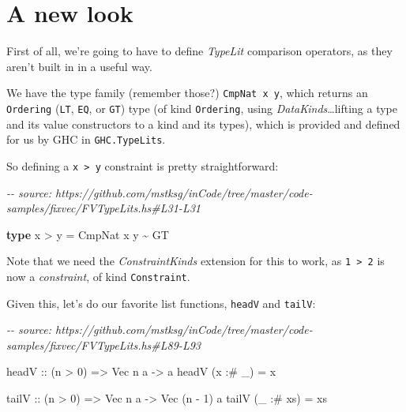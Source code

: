 \documentclass[]{article}
\newenvironment{Shaded}{}{}
\newcommand{\CommentTok}[1]{\textcolor[rgb]{0.38,0.63,0.69}{\textit{#1}}}
\newcommand{\DataTypeTok}[1]{\textcolor[rgb]{0.56,0.13,0.00}{#1}}
\newcommand{\DecValTok}[1]{\textcolor[rgb]{0.25,0.63,0.44}{#1}}
\newcommand{\KeywordTok}[1]{\textcolor[rgb]{0.00,0.44,0.13}{\textbf{#1}}}
\newcommand{\NormalTok}[1]{#1}
\newcommand{\OperatorTok}[1]{\textcolor[rgb]{0.40,0.40,0.40}{#1}}
\newcommand{\OtherTok}[1]{\textcolor[rgb]{0.00,0.44,0.13}{#1}}
\begin{document}
\section{A new look}\label{a-new-look}

First of all, we're going to have to define \emph{TypeLit} comparison operators,
as they aren't built in in a useful way.

We have the type family (remember those?) \texttt{CmpNat\ x\ y}, which returns
an \texttt{Ordering} (\texttt{LT}, \texttt{EQ}, or \texttt{GT}) type (of kind
\texttt{Ordering}, using \emph{DataKinds}\ldots lifting a type and its value
constructors to a kind and its types), which is provided and defined for us by
GHC in \texttt{GHC.TypeLits}.

So defining a \texttt{x\ \textgreater{}\ y} constraint is pretty
straightforward:

\begin{Shaded}
\begin{Highlighting}[]
\CommentTok{{-}{-} source: https://github.com/mstksg/inCode/tree/master/code{-}samples/fixvec/FVTypeLits.hs\#L31{-}L31}

\KeywordTok{type}\NormalTok{ x }\OperatorTok{\textgreater{}}\NormalTok{ y }\OtherTok{=} \DataTypeTok{CmpNat}\NormalTok{ x y }\OperatorTok{\textasciitilde{}} \DataTypeTok{\textquotesingle{}GT}
\end{Highlighting}
\end{Shaded}

Note that we need the \emph{ConstraintKinds} extension for this to work, as
\texttt{1\ \textgreater{}\ 2} is now a \emph{constraint}, of kind
\texttt{Constraint}.

Given this, let's do our favorite list functions, \texttt{headV} and
\texttt{tailV}:

\begin{Shaded}
\begin{Highlighting}[]
\CommentTok{{-}{-} source: https://github.com/mstksg/inCode/tree/master/code{-}samples/fixvec/FVTypeLits.hs\#L89{-}L93}

\OtherTok{headV ::}\NormalTok{ (n }\OperatorTok{\textgreater{}} \DecValTok{0}\NormalTok{) }\OtherTok{=\textgreater{}} \DataTypeTok{Vec}\NormalTok{ n a }\OtherTok{{-}\textgreater{}}\NormalTok{ a}
\NormalTok{headV (x }\OperatorTok{:\#}\NormalTok{ \_)  }\OtherTok{=}\NormalTok{ x}

\OtherTok{tailV ::}\NormalTok{ (n }\OperatorTok{\textgreater{}} \DecValTok{0}\NormalTok{) }\OtherTok{=\textgreater{}} \DataTypeTok{Vec}\NormalTok{ n a }\OtherTok{{-}\textgreater{}} \DataTypeTok{Vec}\NormalTok{ (n }\OperatorTok{{-}} \DecValTok{1}\NormalTok{) a}
\NormalTok{tailV (\_ }\OperatorTok{:\#}\NormalTok{ xs) }\OtherTok{=}\NormalTok{ xs}
\end{Highlighting}
\end{Shaded}
\end{document}
